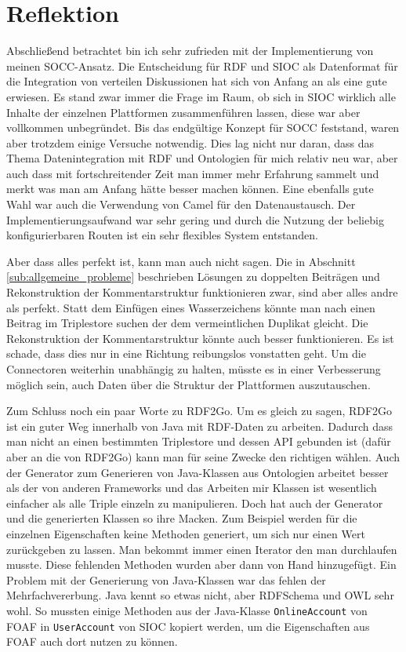 \section{Reflektion} %
\label{sec:bewertung}

Abschließend betrachtet bin ich sehr zufrieden mit der Implementierung von meinen SOCC-Ansatz. Die Entscheidung für RDF und SIOC als Datenformat für die Integration von verteilen Diskussionen hat sich von Anfang an als eine gute erwiesen. Es stand zwar immer die Frage im Raum, ob sich in SIOC wirklich alle Inhalte der einzelnen Plattformen zusammenführen lassen, diese war aber vollkommen unbegründet. Bis das endgültige Konzept für SOCC feststand, waren aber trotzdem einige Versuche notwendig. Dies lag nicht nur daran, dass das Thema Datenintegration mit RDF und Ontologien für mich relativ neu war, aber auch dass mit fortschreitender Zeit man immer mehr Erfahrung sammelt und merkt was man am Anfang hätte besser machen können. Eine ebenfalls gute Wahl war auch die Verwendung von Camel für den Datenaustausch. Der Implementierungsaufwand war sehr gering und durch die Nutzung der beliebig konfigurierbaren Routen ist ein sehr flexibles System entstanden. 

Aber dass alles perfekt ist, kann man auch nicht sagen. Die in Abschnitt \ref{sub:allgemeine_probleme} beschrieben Lösungen zu doppelten Beiträgen und Rekonstruktion der Kommentarstruktur funktionieren zwar, sind aber alles andre als perfekt. Statt dem Einfügen eines Wasserzeichens könnte man nach einen Beitrag im Triplestore suchen der dem vermeintlichen Duplikat gleicht. Die Rekonstruktion der Kommentarstruktur könnte auch besser funktionieren. Es ist schade, dass dies nur in eine Richtung reibungslos vonstatten geht. Um die Connectoren weiterhin unabhängig zu halten, müsste es in einer Verbesserung möglich sein, auch Daten über die Struktur der Plattformen auszutauschen. 

Zum Schluss noch ein paar Worte zu RDF2Go. Um es gleich zu sagen, RDF2Go ist ein guter Weg innerhalb von Java mit RDF-Daten zu arbeiten. Dadurch dass man nicht an einen bestimmten Triplestore und dessen API gebunden ist (dafür aber an die von RDF2Go) kann man für seine Zwecke den richtigen wählen. Auch der Generator zum Generieren von Java-Klassen aus Ontologien arbeitet besser als der von anderen Frameworks und das Arbeiten mir Klassen ist wesentlich einfacher als alle Triple einzeln zu manipulieren. Doch hat auch der Generator und die generierten Klassen so ihre Macken. Zum Beispiel werden für die einzelnen Eigenschaften keine Methoden generiert, um sich nur einen Wert zurückgeben zu lassen. Man bekommt immer einen Iterator den man durchlaufen musste. Diese fehlenden Methoden wurden aber dann von Hand hinzugefügt. Ein Problem mit der Generierung von Java-Klassen war das fehlen der Mehrfachvererbung. Java kennt so etwas nicht, aber RDFSchema und OWL sehr wohl. So mussten einige Methoden aus der Java-Klasse \texttt{OnlineAccount} von FOAF in \texttt{UserAccount} von SIOC kopiert werden, um die Eigenschaften aus FOAF auch dort nutzen zu können.

